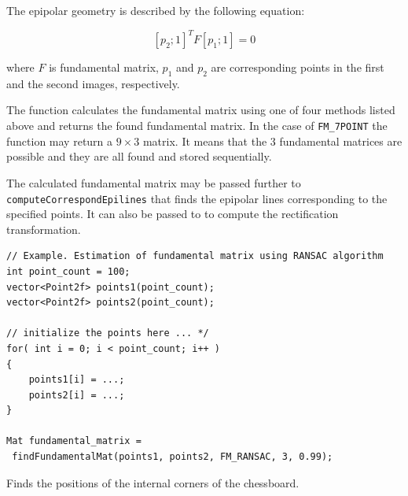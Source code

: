 The epipolar geometry is described by the following equation:

\[ [p_2; 1]^T F [p_1; 1] = 0 \]

where $F$ is fundamental matrix, $p_1$ and $p_2$ are corresponding points in the first and the second images, respectively.

The function calculates the fundamental
matrix using one of four methods listed above and returns the found fundamental matrix. In the case of \texttt{FM\_7POINT} the function may return a $9 \times 3$ matrix. It means that the 3 fundamental matrices are possible and they are all found and stored sequentially.

The calculated fundamental matrix may be passed further to
\texttt{computeCorrespondEpilines} that finds the epipolar lines
corresponding to the specified points. It can also be passed to  to compute the rectification transformation.

\begin{lstlisting}
// Example. Estimation of fundamental matrix using RANSAC algorithm
int point_count = 100;
vector<Point2f> points1(point_count);
vector<Point2f> points2(point_count);

// initialize the points here ... */
for( int i = 0; i < point_count; i++ )
{
    points1[i] = ...;
    points2[i] = ...;
}

Mat fundamental_matrix =
 findFundamentalMat(points1, points2, FM_RANSAC, 3, 0.99);
\end{lstlisting}


Finds the positions of the internal corners of the chessboard.

